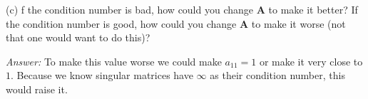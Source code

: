 \documentclass{article}
\begin{document}
    \vspace{1cm}
    (c) f the condition number is bad, how could you change $\bm{A}$ to make it better? If the 
    condition number is good, how could you change $\bm{A}$ to make it worse (not that one 
    would want to do this)?

    \vspace{0.5cm}
    \textit{Answer:} To make this value worse we could make $a_{11} = 1$ or make 
    it very close to $1$. Because we know singular matrices have $\infty$ as their condition
    number, this would raise it. 
\end{document}
